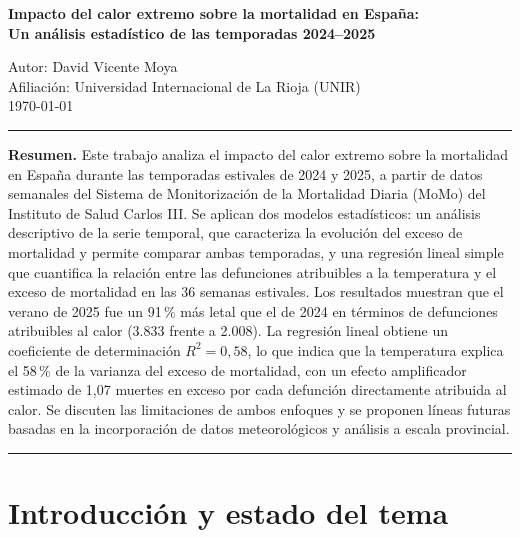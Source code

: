 \documentclass[11pt, a4paper]{article}
\begin{document}
\begin{center}
  {\LARGE\bfseries Impacto del calor extremo sobre la mortalidad en España:\\
  Un análisis estadístico de las temporadas 2024--2025}

  \vspace{0.8em}
  {\large Autor: David Vicente Moya}\\[0.3em]
  {\normalsize Afiliación: Universidad Internacional de La Rioja (UNIR)}\\[0.3em]
  {\normalsize \today}
\end{center}

\vspace{0.5em}
\hrule
\vspace{0.8em}

\noindent\textbf{Resumen.}\quad
Este trabajo analiza el impacto del calor extremo sobre la mortalidad en España
durante las temporadas estivales de 2024 y 2025, a partir de datos semanales del
Sistema de Monitorización de la Mortalidad Diaria (MoMo) del Instituto de Salud
Carlos III. Se aplican dos modelos estadísticos:
un análisis descriptivo de la serie temporal, que caracteriza la evolución del exceso
de mortalidad y permite comparar ambas temporadas, y una regresión lineal simple que
cuantifica la relación entre las defunciones atribuibles a la temperatura y el exceso
de mortalidad en las 36 semanas estivales. Los resultados muestran que el verano de
2025 fue un 91\,\% más letal que el de 2024 en términos de defunciones atribuibles
al calor (3.833 frente a 2.008). La regresión lineal obtiene un coeficiente de
determinación $R^2 = 0{,}58$, lo que indica que la temperatura explica el 58\,\%
de la varianza del exceso de mortalidad, con un efecto amplificador estimado de
1{,}07 muertes en exceso por cada defunción directamente atribuida al calor.
Se discuten las limitaciones de ambos enfoques y se proponen líneas futuras basadas
en la incorporación de datos meteorológicos y análisis a escala provincial.
\vspace{0.8em}
\hrule
\vspace{1em}

\section{Introducción y estado del tema}
\end{document}
